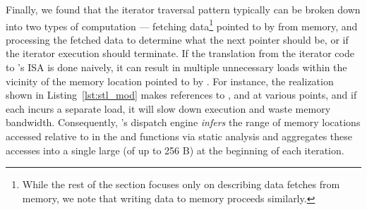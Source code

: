 Finally, we found that the iterator traversal pattern typically can be broken down into two types of computation --- fetching data\footnote{While the rest of the section focuses only on describing data fetches from memory, we note that writing data to memory proceeds similarly.} pointed to by  from memory, and processing the fetched data to determine what the next pointer should be, or if the iterator execution should terminate. If the translation from the iterator code to \name's ISA is done naively, it can result in multiple unnecessary loads within the vicinity of the memory location pointed to by . For instance, the  realization shown in Listing~\ref{lst:stl_mod} makes references to ,  and  at various points, and if each incurs a separate load, it will slow down execution and waste memory bandwidth. Consequently, \name's dispatch engine \emph{infers} the range of memory locations accessed relative to  in the  and  functions via static analysis and aggregates these accesses into a single large  (of up to 256 B) at the beginning of each iteration. 

